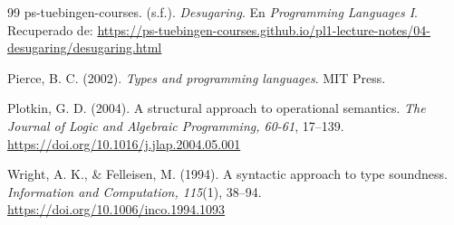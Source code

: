 \documentclass[a4paper,12pt]{article}
\begin{document}
\begin{thebibliography}{99}
ps-tuebingen-courses. (s.f.). \textit{Desugaring}. En \textit{Programming Languages I}. Recuperado de: 
\url{https://ps-tuebingen-courses.github.io/pl1-lecture-notes/04-desugaring/desugaring.html}

Pierce, B. C. (2002). \textit{Types and programming languages}. MIT Press.

Plotkin, G. D. (2004). A structural approach to operational semantics. 
\textit{The Journal of Logic and Algebraic Programming, 60-61}, 17--139. 
\url{https://doi.org/10.1016/j.jlap.2004.05.001}

Wright, A. K., \& Felleisen, M. (1994). A syntactic approach to type soundness. 
\textit{Information and Computation, 115}(1), 38--94. 
\url{https://doi.org/10.1006/inco.1994.1093}

\end{thebibliography}
\end{document}
